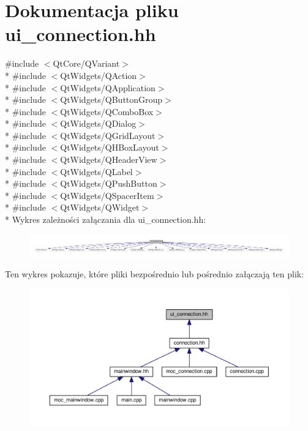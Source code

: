\hypertarget{ui__connection_8hh}{}\section{Dokumentacja pliku ui\+\_\+connection.\+hh}
\label{ui__connection_8hh}
{\ttfamily \#include $<$Qt\+Core/\+Q\+Variant$>$}\\*
{\ttfamily \#include $<$Qt\+Widgets/\+Q\+Action$>$}\\*
{\ttfamily \#include $<$Qt\+Widgets/\+Q\+Application$>$}\\*
{\ttfamily \#include $<$Qt\+Widgets/\+Q\+Button\+Group$>$}\\*
{\ttfamily \#include $<$Qt\+Widgets/\+Q\+Combo\+Box$>$}\\*
{\ttfamily \#include $<$Qt\+Widgets/\+Q\+Dialog$>$}\\*
{\ttfamily \#include $<$Qt\+Widgets/\+Q\+Grid\+Layout$>$}\\*
{\ttfamily \#include $<$Qt\+Widgets/\+Q\+H\+Box\+Layout$>$}\\*
{\ttfamily \#include $<$Qt\+Widgets/\+Q\+Header\+View$>$}\\*
{\ttfamily \#include $<$Qt\+Widgets/\+Q\+Label$>$}\\*
{\ttfamily \#include $<$Qt\+Widgets/\+Q\+Push\+Button$>$}\\*
{\ttfamily \#include $<$Qt\+Widgets/\+Q\+Spacer\+Item$>$}\\*
{\ttfamily \#include $<$Qt\+Widgets/\+Q\+Widget$>$}\\*
Wykres zależności załączania dla ui\+\_\+connection.\+hh\+:\nopagebreak
\begin{figure}[H]
\begin{center}
\leavevmode
\includegraphics[width=350pt]{ui__connection_8hh__incl}
\end{center}
\end{figure}
Ten wykres pokazuje, które pliki bezpośrednio lub pośrednio załączają ten plik\+:\nopagebreak
\begin{figure}[H]
\begin{center}
\leavevmode
\includegraphics[width=350pt]{ui__connection_8hh__dep__incl}
\end{center}
\end{figure}
